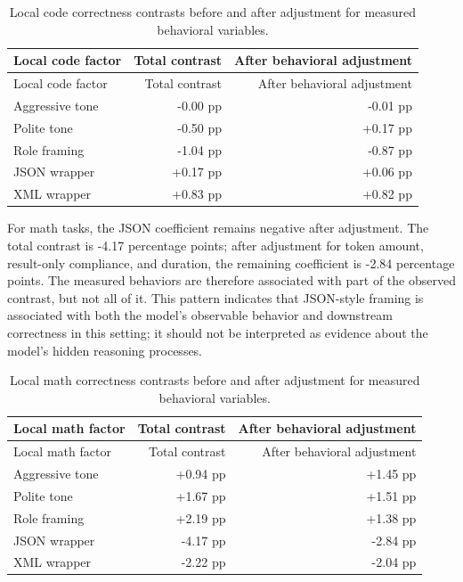 \documentclass{llncs}
\begin{document}
\begin{longtable}[]{@{}lrr@{}}
\caption{Local code correctness contrasts before and after adjustment
for measured behavioral variables.}\tabularnewline
\toprule\noalign{}
Local code factor & Total contrast & After behavioral adjustment \\
\midrule\noalign{}
\endfirsthead
\toprule\noalign{}
Local code factor & Total contrast & After behavioral adjustment \\
\midrule\noalign{}
\endhead
\bottomrule\noalign{}
\endlastfoot
Aggressive tone & -0.00 pp & -0.01 pp \\
Polite tone & -0.50 pp & +0.17 pp \\
Role framing & -1.04 pp & -0.87 pp \\
JSON wrapper & +0.17 pp & +0.06 pp \\
XML wrapper & +0.83 pp & +0.82 pp \\
\end{longtable}

For math tasks, the JSON coefficient remains negative after adjustment. The total contrast is -4.17 percentage points; after adjustment for token amount, result-only compliance, and duration, the remaining coefficient is -2.84 percentage points. The measured behaviors are therefore associated with part of the observed contrast, but not all of it. This pattern indicates that JSON-style framing is associated with both the model's observable behavior and downstream correctness in this setting; it should not be interpreted as evidence about the model's hidden reasoning processes.

\begin{longtable}[]{@{}lrr@{}}
\caption{Local math correctness contrasts before and after adjustment
for measured behavioral variables.}\tabularnewline
\toprule\noalign{}
Local math factor & Total contrast & After behavioral adjustment \\
\midrule\noalign{}
\endfirsthead
\toprule\noalign{}
Local math factor & Total contrast & After behavioral adjustment \\
\midrule\noalign{}
\endhead
\bottomrule\noalign{}
\endlastfoot
Aggressive tone & +0.94 pp & +1.45 pp \\
Polite tone & +1.67 pp & +1.51 pp \\
Role framing & +2.19 pp & +1.38 pp \\
JSON wrapper & -4.17 pp & -2.84 pp \\
XML wrapper & -2.22 pp & -2.04 pp \\
\end{longtable}
\end{document}
